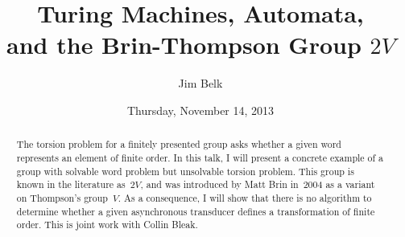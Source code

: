 \documentclass{UAmathtalk}
\author{Jim Belk}
\title{Turing Machines, Automata,\\ and the Brin-Thompson Group $2V$}
\date{Thursday, November 14, 2013}
\begin{document}
\maketitle

\begin{abstract}
The torsion problem for a finitely presented group asks whether a given word represents an element of finite order.  In this talk, I will present a concrete example of a group with solvable word problem but unsolvable torsion problem.  This group is known in the literature as~$2V$, and was introduced by Matt Brin in~2004 as a variant on Thompson's group~$V$.  As a consequence, I will show that there is no algorithm to determine whether a given asynchronous transducer defines a transformation of finite order.  This is joint work with Collin Bleak.
\end{abstract}
\end{document}
